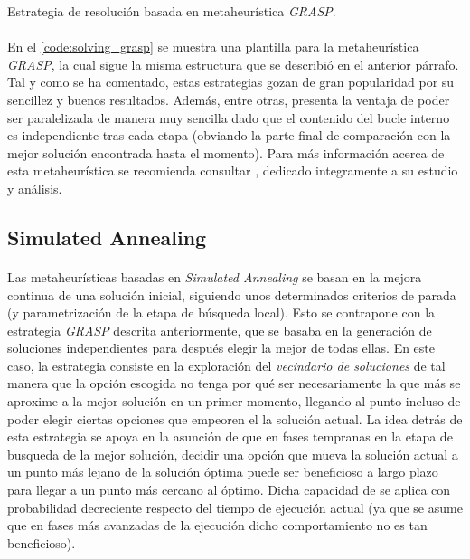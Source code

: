 \documentclass{subfiles}
\begin{document}
      \begin{algorithm}[ht]
        \SetAlgoLined
        \caption{Estrategia de resolución basada en metaheurística \emph{GRASP}.}
        \label{code:solving_grasp}
      \end{algorithm}

      \paragraph{}
      En el \cref{code:solving_grasp} se muestra una plantilla para la metaheurística \emph{GRASP}, la cual sigue la misma estructura que se describió en el anterior párrafo. Tal y como se ha comentado, estas estrategias gozan de gran popularidad por su sencillez y buenos resultados. Además, entre otras, presenta la ventaja de poder ser paralelizada de manera muy sencilla dado que el contenido del bucle interno es independiente tras cada etapa (obviando la parte final de comparación con la mejor solución encontrada hasta el momento). Para más información acerca de esta metaheurística se recomienda consultar \cite{resende2016optimization}, dedicado integramente a su estudio y análisis.

      \subsection{Simulated Annealing}
      \label{sec:solving_simulated_annealing}

        \paragraph{}
        Las metaheurísticas basadas en \emph{Simulated Annealing} se basan en la mejora continua de una solución inicial, siguiendo unos determinados criterios de parada (y parametrización de la etapa de búsqueda local). Esto se contrapone con la estrategia \emph{GRASP} descrita anteriormente, que se basaba en la generación de soluciones independientes para después elegir la mejor de todas ellas. En este caso, la estrategia consiste en la exploración del \emph{vecindario de soluciones} de tal manera que la opción escogida no tenga por qué ser necesariamente la que más se aproxime a la mejor solución en un primer momento, llegando al punto incluso de poder elegir ciertas opciones que empeoren el la solución actual. La idea detrás de esta estrategia se apoya en la asunción de que en fases tempranas en la etapa de busqueda de la mejor solución, decidir una opción que mueva la solución actual a un punto más lejano de la solución óptima puede ser beneficioso a largo plazo para llegar a un punto más cercano al óptimo. Dicha capacidad de  se aplica con probabilidad decreciente respecto del tiempo de ejecución actual (ya que se asume que en fases más avanzadas de la ejecución dicho comportamiento no es tan beneficioso).
\end{document}

